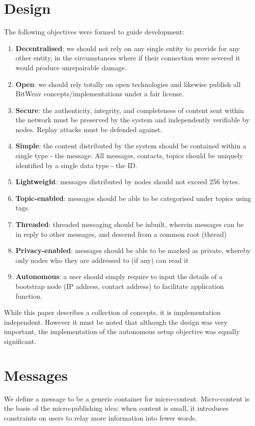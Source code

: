 \documentclass[10pt,a4paper,onecolumn]{article}
\begin{document}
\section{Design}
The following objectives were formed to guide development:
\begin{enumerate}
\item \textbf{Decentralised}: we should not rely on any single entity to provide for any other entity, in the circumstances where if their connection were severed it would produce unrepairable damage. 
\item \textbf{Open}: we should rely totally on open technologies and likewise publish all BitWeav concepts/implementations under a fair license.
\item \textbf{Secure}: the authenticity, integrity, and completeness of content sent within the network must be preserved by the system and independently verifiable by nodes. Replay attacks must be defended against.
\item \textbf{Simple}: the content distributed by the system should be contained within a single type - the message. All messages, contacts, topics should be uniquely identified by a single data type - the ID.
\item \textbf{Lightweight}: messages distributed by nodes should not exceed 256 bytes. 
\item \textbf{Topic-enabled}: messages should be able to be categorised under topics using tags.
\item \textbf{Threaded}: threaded messaging should be inbuilt, wherein messages can be in reply to other messages, and descend from a common root (thread)
\item \textbf{Privacy-enabled}: messages should be able to be marked as private, whereby only nodes who they are addressed to (if any) can read it
\item \textbf{Autonomous}: a user should simply require to input the details of a bootstrap node (IP address, contact address) to facilitate application function.
\end{enumerate}

While this paper describes a collection of concepts, it is implementation independent. However it must be noted that although the design was very important, the implementation of the autonomous setup objective was equally significant.


\section{Messages}
We define a message to be a generic container for micro-content. Micro-content is the basis of the micro-publishing idea: when content is small, it introduces constraints on users to relay more information into fewer words.  
\end{document}
